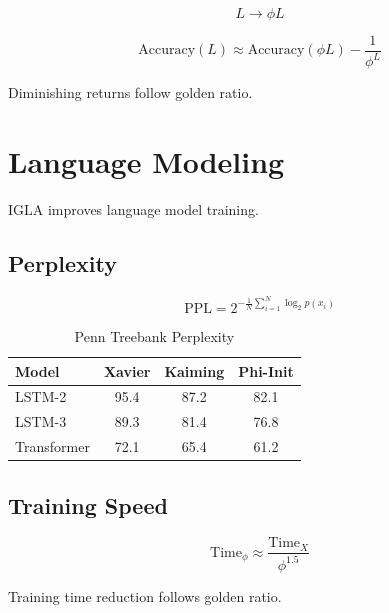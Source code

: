 \begin{equation}
L \to \phi L
\end{equation}

\begin{proposition}
\label{prop:golden-depth}
\begin{equation}
\text{Accuracy}(L) \approx \text{Accuracy}(\phi L) - \frac{1}{\phi^L}
\end{equation}

Diminishing returns follow golden ratio.
\end{proposition}

\section{Language Modeling}

IGLA improves language model training.

\subsection{Perplexity}

\begin{definition}[Perplexity]
\label{def:ppl}
\begin{equation}
\text{PPL} = 2^{-\frac{1}{N}\sum_{i=1}^N \log_2 p(x_i)}
\end{equation}
\end{definition}

\begin{table}[h]
\centering
\caption{Penn Treebank Perplexity}
\begin{tabular}{lccc}
\toprule
Model & Xavier & Kaiming & Phi-Init \\
\midrule
LSTM-2 & 95.4 & 87.2 & 82.1 \\
LSTM-3 & 89.3 & 81.4 & 76.8 \\
Transformer & 72.1 & 65.4 & 61.2 \\
\bottomrule
\end{tabular}
\end{table}

\subsection{Training Speed}

\begin{theorem}
\label{thm:golden-speedup}
\begin{equation}
\text{Time}_{\phi} \approx \frac{\text{Time}_{X}}{\phi^{1.5}}
\end{equation}

Training time reduction follows golden ratio.
\end{theorem}

